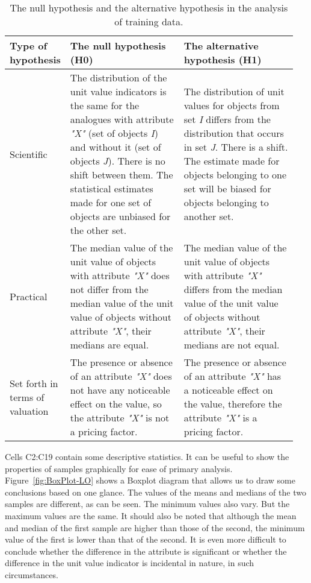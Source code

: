 \documentclass[]{scrreprt}
\begin{document}
\begin{table}[htp]
	\caption{The null hypothesis and the alternative hypothesis in the analysis of training data.}  \label{tab:nul-alt-hypothesis-variants}
	\centering
	\begin{tabularx}{\textwidth}{p{0.15\linewidth} p{0.4\linewidth} p{0.4\linewidth}} 
		\hline
		Type of hypothesis&The null hypothesis (H0)&The alternative hypothesis (H1)\\
		\hline
		Scientific&The distribution of the unit value indicators is the same for the analogues with attribute \textit{"X"} (set of objects \textit{I}) and without it (set of objects \textit{J}). There is no shift between them. The statistical estimates made for one set of objects are unbiased for the other set.&The distribution of unit values for objects from set \textit{I} differs from the distribution that occurs in set \textit{J}. There is a shift. The estimate made for objects belonging to one set will be biased for objects belonging to another set.\\
		\hline
		Practical&The median value of the unit value of objects with attribute \textit{"X"} does not differ from the median value of the unit value of objects without attribute \textit{"X"}, their medians are equal.&The median value of the unit value of objects with attribute \textit{"X"} differs from the median value of the unit value of objects without attribute \textit{"X"}, their medians are not equal.\\
		\hline
		Set forth in terms of valuation&The presence or absence of an attribute  \textit{"X"} does not have any noticeable effect on the value, so the attribute \textit{"X"} is not a pricing factor.&The presence or absence of an attribute \textit{"X"} has a noticeable effect on the value, therefore the attribute \textit{"X"} is a pricing factor.\\ \hline
	\end{tabularx}
\end{table}
%
Cells C2:C19 contain some descriptive statistics. It can be useful to show the properties of samples graphically for ease of primary analysis. Figure~\ref{fig:BoxPlot-LO} shows a Boxplot diagram that allows us to draw some conclusions based on one glance. The values of the means and medians of the two samples are different, as can be seen. The minimum values also vary. But the maximum values are the same. It should also be noted that although the mean and median of the first sample are higher than those of the second, the minimum value of the first is lower than that of the second. It is even more difficult to conclude whether the difference in the attribute is significant or whether the difference in the unit value indicator is incidental in nature, in such circumstances.
\end{document}
